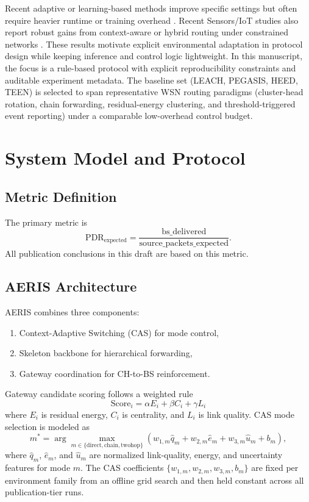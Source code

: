 ﻿\documentclass[sensors,article,submit,moreauthors,pdftex]{Definitions/mdpi}
\begin{document}
Recent adaptive or learning-based methods improve specific settings but often require heavier runtime or training overhead \cite{Ren2024,Okine2024,Chen2019Survey}. Recent Sensors/IoT studies also report robust gains from context-aware or hybrid routing under constrained networks \cite{ElFouly2023ILP,Dan2024EMRAR,Bhukya2025Hybrid}. These results motivate explicit environmental adaptation in protocol design while keeping inference and control logic lightweight. In this manuscript, the focus is a rule-based protocol with explicit reproducibility constraints and auditable experiment metadata.
The baseline set (LEACH, PEGASIS, HEED, TEEN) is selected to span representative WSN routing paradigms (cluster-head rotation, chain forwarding, residual-energy clustering, and threshold-triggered event reporting) under a comparable low-overhead control budget.

\section{System Model and Protocol}
\subsection{Metric Definition}
The primary metric is
\begin{equation}
\mathrm{PDR}_{\mathrm{expected}} = \frac{\mathrm{bs\_delivered}}{\mathrm{source\_packets\_expected}}.
\end{equation}
All publication conclusions in this draft are based on this metric.

\subsection{AERIS Architecture}
AERIS combines three components:
\begin{enumerate}
\item Context-Adaptive Switching (CAS) for mode control,
\item Skeleton backbone for hierarchical forwarding,
\item Gateway coordination for CH-to-BS reinforcement.
\end{enumerate}
Gateway candidate scoring follows a weighted rule
\begin{equation}
\mathrm{Score}_i = \alpha E_i + \beta C_i + \gamma L_i
\end{equation}
where $E_i$ is residual energy, $C_i$ is centrality, and $L_i$ is link quality.
CAS mode selection is modeled as
\begin{equation}
m^{*}=\arg\max_{m\in\{\mathrm{direct},\mathrm{chain},\mathrm{twohop}\}}
\left(w_{1,m}\hat{q}_{m}+w_{2,m}\hat{e}_{m}+w_{3,m}\hat{u}_{m}+b_m\right),
\end{equation}
where $\hat{q}_{m}$, $\hat{e}_{m}$, and $\hat{u}_{m}$ are normalized link-quality, energy, and uncertainty features for mode $m$.
The CAS coefficients $\{w_{1,m}, w_{2,m}, w_{3,m}, b_m\}$ are fixed per environment family from an offline grid search and then held constant across all publication-tier runs.
\end{document}
